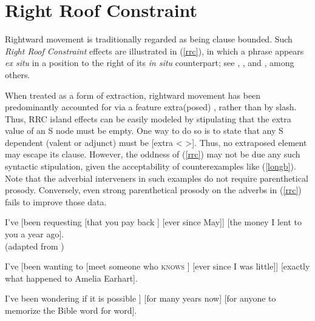 \documentclass[output=paper
	        ,collection
	        ,collectionchapter
 	        ,biblatex
                ,babelshorthands
                ,newtxmath
                ,draftmode
                ,colorlinks, citecolor=brown
]{langscibook}
\begin{document}
\section{Right Roof Constraint}

Rightward movement is traditionally regarded as being clause bounded. Such
 \emph{Right Roof Constraint}  \citep{Ross67} effects are illustrated in (\ref{rrc}), 
in which a phrase appears \emph{ex situ} in a position 
to the right of its \emph{in situ} counterpart; see   \citet{akma75}, \citet{baltin78}, and  \citet{stowelldiss}, among others.

\eal \label{rrc}
\zl



\noindent
When treated as a form of extraction, rightward movement has been predominantly
accounted for via a feature {\sc extra(posed)} \citep{Keller95b,Noord:Bouma:96,eynde96,
kellerverb,Mueller99a,KimSag2005}, rather than by {\sc slash}.  
Thus, RRC island effects can be easily modeled by stipulating that the  {\sc extra} value of an S node must be empty. One way to do so is to state that any S dependent (valent or adjunct) must be [{\sc extra} < >].
Thus, no extraposed element may escape its clause. However,  the oddness of (\ref{rrc}) may not be due any such syntactic stipulation, given the acceptability of counterexamples like (\ref{longb}). Note that the adverbial interveners in such examples do not  require parenthetical prosody. Conversely, even strong  parenthetical
prosody on the adverbs in (\ref{rrc}) fails to improve those data.


\eal \label{longb}
\ex  I've [been requesting [that you pay back \spc] [ever since May]] [the money
I lent to you a year ago].\\
  (adapted from \citealp[167]{Kayne98a-u})

\ex I've [been wanting to [meet someone
who \textsc{knows} \spc] [ever since I was little]] [exactly what happened to Amelia Earhart].

\ex  I've been wondering  if it is possible   \spc]
[for many years now] [for anyone to memorize the Bible word for word].\\
\citep[861]{chavesrnr}
\zl
\end{document}
